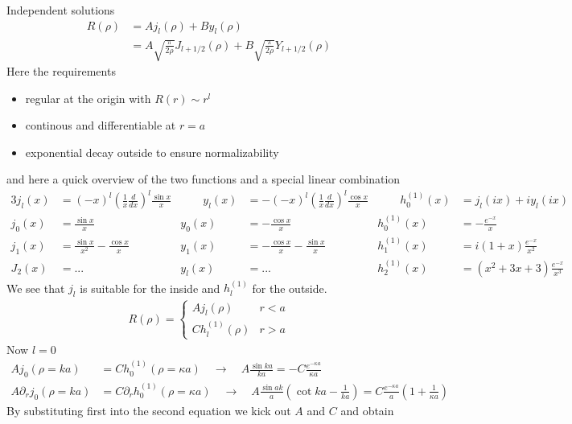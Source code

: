 \documentclass[10pt,a4paper]{book}
\theoremstyle{definition}
\begin{document}
Independent solutions
\begin{align}
R(\rho)
&=Aj_l(\rho)+By_l(\rho)\\
&=A\sqrt{\frac{\pi}{2\rho}}J_{l+1/2}(\rho)+B\sqrt{\frac{\pi}{2\rho}}Y_{l+1/2}(\rho)
\end{align}
Here the requirements
\begin{itemize}
\item regular at the origin with $R(r)\sim r^l$
\item continous and differentiable at $r=a$
\item exponential decay outside to ensure normalizability
\end{itemize}
and here a quick overview of the two functions and a special linear combination
\begin{alignat*}{3}
j_l(x)&=(-x)^l\left(\frac{1}{x}\frac{d}{dx}\right)^l\frac{\sin x}{x} & \qquad y_l(x)&=-(-x)^l\left(\frac{1}{x}\frac{d}{dx}\right)^l\frac{\cos x}{x} &\qquad  h^{(1)}_0(x)&=j_l(ix)+iy_l(ix)\\
j_0(x)&=\frac{\sin x}{x}                                             & y_0(x)&=-\frac{\cos x}{x}                    & h^{(1)}_0(x)&=-\frac{e^{-x}}{x}\\
j_1(x)&=\frac{\sin x}{x^2}-\frac{\cos x}{x}                          & y_1(x)&=-\frac{\cos x}{x}-\frac{\sin x}{x}   & h^{(1)}_1(x)&=i(1+x)\frac{e^{-x}}{x^2}\\
J_2(x)&=...                                                          & y_l(x)&=...                                  & h^{(1)}_2(x)&=(x^2+3x+3)\frac{e^{-x}}{x^3} 
\end{alignat*} 
We see that $j_l$ is suitable for the inside and $h^{(1)}_l$ for the outside.
\begin{align}
R(\rho)=\left\{\begin{matrix}
Aj_l(\rho) & r<a\\
Ch^{(1)}_l(\rho) & r>a
\end{matrix}\right.
\end{align}
Now $l=0$
\begin{align}
Aj_0(\rho=ka)&=Ch^{(1)}_0(\rho=\kappa a)\quad\rightarrow\quad A\frac{\sin ka}{ka}=-C\frac{e^{-\kappa a}}{\kappa a}\\
A\partial_r j_0(\rho=ka)&=C\partial_r h^{(1)}_0(\rho=\kappa a)\quad\rightarrow\quad 
%
A\frac{\sin ak}{a}\left(\cot ka-\frac{1}{ka}\right)=C\frac{e^{-\kappa a}}{a}\left(1+\frac{1}{\kappa a}\right)
\end{align}
By substituting first into the second equation we kick out $A$ and $C$ and obtain
\end{document}
